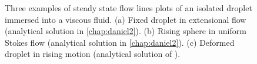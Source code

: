 \begin{figure}
    \centering
    \caption{Three examples of steady state flow lines plots of an isolated droplet immersed into a viscous fluid. 
    (a) Fixed droplet in extensional flow (analytical solution in \ref{chap:daniel2}).
    (b) Rising sphere in uniform Stokes flow (analytical solution in \ref{chap:daniel2}). 
    (c) Deformed droplet in rising motion (analytical solution of \citet{taylor1964deformation}). }
    \label{fig:flowlines1}
\end{figure} 

